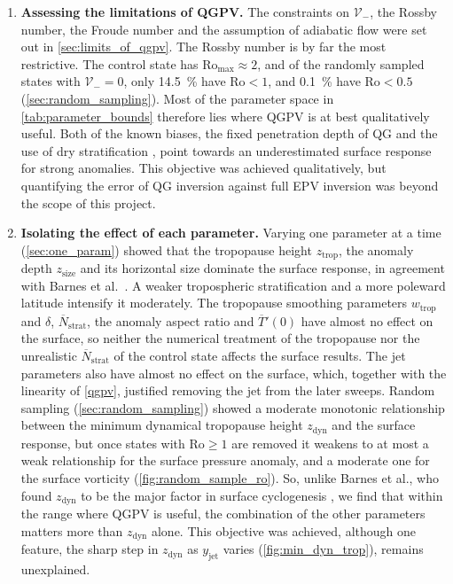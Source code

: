 \documentclass{article}
\begin{document}
\begin{enumerate}
    \item \textbf{Assessing the limitations of QGPV.}
    The constraints on $\mathcal{V}_-$, the Rossby number, the Froude number and the assumption of adiabatic flow were set out in \cref{sec:limits_of_qgpv}.
    The Rossby number is by far the most restrictive.
    The control state has $\mathrm{Ro}_\text{max} \approx 2$, and of the randomly sampled states with $\mathcal{V}_- = 0$, only \qty{14.5}{\percent} have $\mathrm{Ro} < 1$, and \qty{0.1}{\percent} have $\mathrm{Ro} < 0.5$ (\cref{sec:random_sampling}).
    Most of the parameter space in \cref{tab:parameter_bounds} therefore lies where QGPV is at best qualitatively useful.
    Both of the known biases, the fixed penetration depth of QG \cite{Davis1992jas} and the use of dry stratification \cite{Hoskins1985}, point towards an underestimated surface response for strong anomalies.
    This objective was achieved qualitatively, but quantifying the error of QG inversion against full EPV inversion was beyond the scope of this project.

    \item \textbf{Isolating the effect of each parameter.}
    Varying one parameter at a time (\cref{sec:one_param}) showed that the tropopause height $z_\text{trop}$, the anomaly depth $z_\text{size}$ and its horizontal size dominate the surface response, in agreement with Barnes et al.\ \cite{Barnes2022main}.
    A weaker tropospheric stratification and a more poleward latitude intensify it moderately.
    The tropopause smoothing parameters $w_\text{trop}$ and $\delta$, $\overline N_\text{strat}$, the anomaly aspect ratio and $\overline T'(0)$ have almost no effect on the surface, so neither the numerical treatment of the tropopause nor the unrealistic $\overline N_\text{strat}$ of the control state affects the surface results.
    The jet parameters also have almost no effect on the surface, which, together with the linearity of \cref{qgpv}, justified removing the jet from the later sweeps.
    Random sampling (\cref{sec:random_sampling}) showed a moderate monotonic relationship between the minimum dynamical tropopause height $z_\text{dyn}$ and the surface response, but once states with $\mathrm{Ro} \geq 1$ are removed it weakens to at most a weak relationship for the surface pressure anomaly, and a moderate one for the surface vorticity (\cref{fig:random_sample_ro}).
    So, unlike Barnes et al., who found $z_\text{dyn}$ to be the major factor in surface cyclogenesis \cite{Barnes2022main}, we find that within the range where QGPV is useful, the combination of the other parameters matters more than $z_\text{dyn}$ alone.
    This objective was achieved, although one feature, the sharp step in $z_\text{dyn}$ as $y_\text{jet}$ varies (\cref{fig:min_dyn_trop}), remains unexplained.


\end{enumerate}
\end{document}
